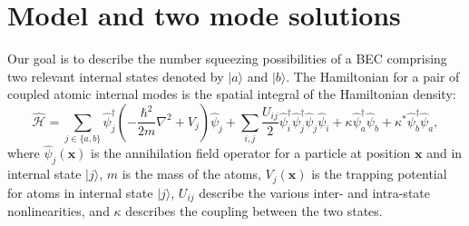 \documentclass{iopart}
\begin{document}
\section{Model and two mode solutions}
\label{secTwoModeAnalytic}
Our goal is to describe the number squeezing possibilities of a BEC comprising two relevant internal states denoted by $|a\rangle$ and $|b\rangle$.  The Hamiltonian for a pair of coupled atomic internal modes is the spatial integral of the Hamiltonian density:
\begin{equation}
\hat{\mathcal{H}} = \sum_{j\in \{a,b\}} \hat{\psi}_j^{\dagger}\left(-\frac{\hbar^2}{2 m}\nabla^2+V_j\right)\hat{\psi}_j 
          + \sum_{i,j}\frac{U_{i j}}{2} \hat{\psi}_i^{\dagger} \hat{\psi}_j^{\dagger} \hat{\psi}_j \hat{\psi}_i
          + \kappa \hat{\psi}_a^{\dagger} \hat{\psi}_b + \kappa^* \hat{\psi}_b^{\dagger}  \hat{\psi}_a,
\label{eqFieldHamiltonian}
\end{equation}
where $\hat{\psi}_j(\mathbf{x})$ is the annihilation field operator for a particle at position $\mathbf{x}$ and in internal state $|j\rangle$, $m$ is the mass of the atoms, $V_j(\mathbf{x})$ is the trapping potential for atoms in internal state $|j\rangle$, $U_{ij}$ describe the various inter- and intra-state nonlinearities, and $\kappa$ describes the coupling between the two states.  
\end{document}
